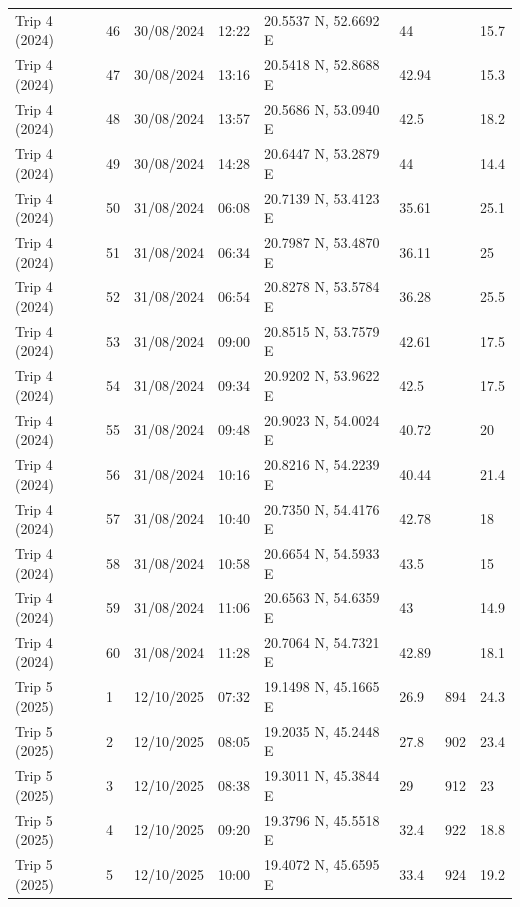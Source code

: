 \begin{scriptsize}
\begin{longtable}{llllllll}
Trip 4 (2024) & 46 & 30/08/2024 & 12:22 & 20.5537 N, 52.6692 E & 44 & \textemdash{} & 15.7 \\
Trip 4 (2024) & 47 & 30/08/2024 & 13:16 & 20.5418 N, 52.8688 E & 42.94 & \textemdash{} & 15.3 \\
Trip 4 (2024) & 48 & 30/08/2024 & 13:57 & 20.5686 N, 53.0940 E & 42.5 & \textemdash{} & 18.2 \\
Trip 4 (2024) & 49 & 30/08/2024 & 14:28 & 20.6447 N, 53.2879 E & 44 & \textemdash{} & 14.4 \\
Trip 4 (2024) & 50 & 31/08/2024 & 06:08 & 20.7139 N, 53.4123 E & 35.61 & \textemdash{} & 25.1 \\
Trip 4 (2024) & 51 & 31/08/2024 & 06:34 & 20.7987 N, 53.4870 E & 36.11 & \textemdash{} & 25 \\
Trip 4 (2024) & 52 & 31/08/2024 & 06:54 & 20.8278 N, 53.5784 E & 36.28 & \textemdash{} & 25.5 \\
Trip 4 (2024) & 53 & 31/08/2024 & 09:00 & 20.8515 N, 53.7579 E & 42.61 & \textemdash{} & 17.5 \\
Trip 4 (2024) & 54 & 31/08/2024 & 09:34 & 20.9202 N, 53.9622 E & 42.5 & \textemdash{} & 17.5 \\
Trip 4 (2024) & 55 & 31/08/2024 & 09:48 & 20.9023 N, 54.0024 E & 40.72 & \textemdash{} & 20 \\
Trip 4 (2024) & 56 & 31/08/2024 & 10:16 & 20.8216 N, 54.2239 E & 40.44 & \textemdash{} & 21.4 \\
Trip 4 (2024) & 57 & 31/08/2024 & 10:40 & 20.7350 N, 54.4176 E & 42.78 & \textemdash{} & 18 \\
Trip 4 (2024) & 58 & 31/08/2024 & 10:58 & 20.6654 N, 54.5933 E & 43.5 & \textemdash{} & 15 \\
Trip 4 (2024) & 59 & 31/08/2024 & 11:06 & 20.6563 N, 54.6359 E & 43 & \textemdash{} & 14.9 \\
Trip 4 (2024) & 60 & 31/08/2024 & 11:28 & 20.7064 N, 54.7321 E & 42.89 & \textemdash{} & 18.1 \\
Trip 5 (2025) & 1 & 12/10/2025 & 07:32 & 19.1498 N, 45.1665 E & 26.9 & 894 & 24.3 \\
Trip 5 (2025) & 2 & 12/10/2025 & 08:05 & 19.2035 N, 45.2448 E & 27.8 & 902 & 23.4 \\
Trip 5 (2025) & 3 & 12/10/2025 & 08:38 & 19.3011 N, 45.3844 E & 29 & 912 & 23 \\
Trip 5 (2025) & 4 & 12/10/2025 & 09:20 & 19.3796 N, 45.5518 E & 32.4 & 922 & 18.8 \\
Trip 5 (2025) & 5 & 12/10/2025 & 10:00 & 19.4072 N, 45.6595 E & 33.4 & 924 & 19.2 \\

\end{longtable}
\end{scriptsize}

